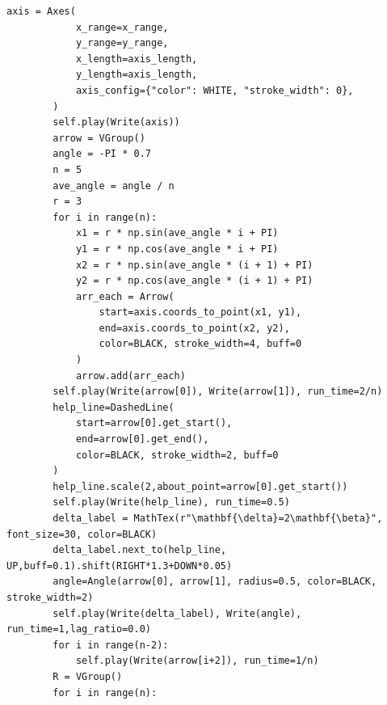 \documentclass[12pt,a4paper]{ctexrep}
\begin{document}
\begin{lstlisting}[style=pycode]
        axis = Axes(
            x_range=x_range,
            y_range=y_range,
            x_length=axis_length,
            y_length=axis_length,
            axis_config={"color": WHITE, "stroke_width": 0},
        )
        self.play(Write(axis))
        arrow = VGroup()
        angle = -PI * 0.7
        n = 5
        ave_angle = angle / n
        r = 3
        for i in range(n):
            x1 = r * np.sin(ave_angle * i + PI)
            y1 = r * np.cos(ave_angle * i + PI)
            x2 = r * np.sin(ave_angle * (i + 1) + PI)
            y2 = r * np.cos(ave_angle * (i + 1) + PI)
            arr_each = Arrow(
                start=axis.coords_to_point(x1, y1),
                end=axis.coords_to_point(x2, y2),
                color=BLACK, stroke_width=4, buff=0
            )
            arrow.add(arr_each)
        self.play(Write(arrow[0]), Write(arrow[1]), run_time=2/n)
        help_line=DashedLine(
            start=arrow[0].get_start(),
            end=arrow[0].get_end(),
            color=BLACK, stroke_width=2, buff=0
        )
        help_line.scale(2,about_point=arrow[0].get_start())
        self.play(Write(help_line), run_time=0.5)
        delta_label = MathTex(r"\mathbf{\delta}=2\mathbf{\beta}", font_size=30, color=BLACK)
        delta_label.next_to(help_line, UP,buff=0.1).shift(RIGHT*1.3+DOWN*0.05)
        angle=Angle(arrow[0], arrow[1], radius=0.5, color=BLACK, stroke_width=2)
        self.play(Write(delta_label), Write(angle), run_time=1,lag_ratio=0.0)
        for i in range(n-2):
            self.play(Write(arrow[i+2]), run_time=1/n)
        R = VGroup()
        for i in range(n):



\end{lstlisting}
\end{document}
